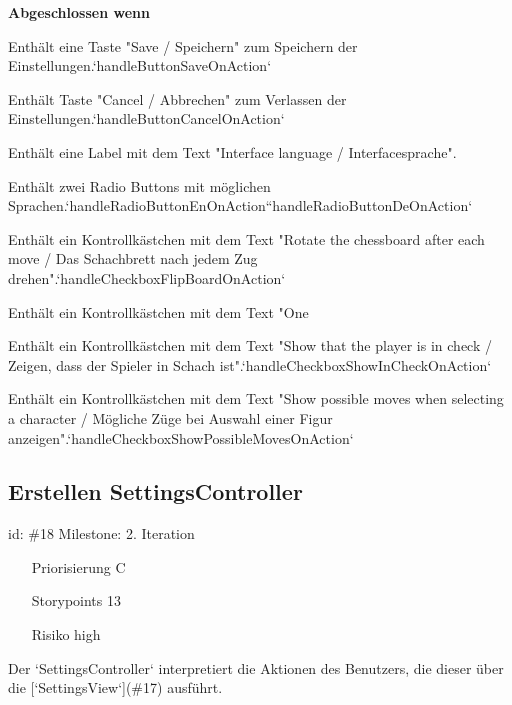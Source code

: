 \textbf{Abgeschlossen wenn}
\begin{todolist}
    \item[\done]  Enthält eine Taste "Save / Speichern" zum Speichern der Einstellungen.`handleButtonSaveOnAction`
  \item[\done]  Enthält Taste "Cancel / Abbrechen" zum Verlassen der Einstellungen.`handleButtonCancelOnAction`
  \item[\done]  Enthält eine Label mit dem Text "Interface language / Interfacesprache".
  \item[\done]  Enthält zwei Radio Buttons mit möglichen Sprachen.`handleRadioButtonEnOnAction``handleRadioButtonDeOnAction`
  \item[\done]  Enthält ein Kontrollkästchen mit dem Text "Rotate the chessboard after each move / Das Schachbrett nach jedem Zug drehen".`handleCheckboxFlipBoardOnAction`
  \item[\done]  Enthält ein Kontrollkästchen mit dem Text "One
  \item[\done]  Enthält ein Kontrollkästchen mit dem Text "Show that the player is in check / Zeigen, dass der Spieler in Schach ist".`handleCheckboxShowInCheckOnAction`
  \item[\done]  Enthält ein Kontrollkästchen mit dem Text "Show possible moves when selecting a character / Mögliche Züge bei Auswahl einer Figur anzeigen".`handleCheckboxShowPossibleMovesOnAction`

\end{todolist}


\subsection*{Erstellen SettingsController}
id: \#18 Milestone: 2. Iteration\\

\begin{itemize}
\item[Priorisierung] C
\item[Storypoints] 13
\item[Risiko] high
\end{itemize}

Der `SettingsController` interpretiert die Aktionen des Benutzers, die dieser über die [`SettingsView`](\#17) ausführt.

